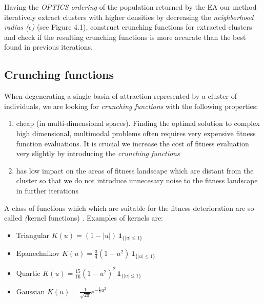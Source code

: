Having the \textit{OPTICS ordering} of the population returned by the EA our
method iteratively extract clusters with higher densities by decreasing 
the \textit{neighborhood radius ($\epsilon$)} (see Figure 4.1), construct
crunching functions for extracted clusters and check if the resulting crunching functions 
is more accurate than the best found in previous iterations. 

\begin{algorithmic}[1]
	\ENDIF
\ENDWHILE
\end{algorithmic}

\subsection{Crunching functions}
When degenerating a single basin of attraction represented by a cluster of
individuals, we are looking for \textit{crunching functions} with the following
properties:

\begin{enumerate}
  \item cheap (in multi-dimensional spaces). Finding the optimal solution to
  complex high dimensional, multimodal problems often requires 
  very expensive fitness function evaluations. It is crucial we increase the
  cost of fitness evaluation very slightly by introducing the \textit{crunching
  functions}
  \item has low impact on the areas of fitness landscape which are distant from
  the cluster so that we do not introduce unnecesary noise to the fitness landscape
  in further iterations
\end{enumerate}

A class of functions which which are suitable for the fitness deterioration are
so called \textit(kernel functions) \cite{kernel}. Examples of kernels are: 
\begin{itemize}
  \item Triangular 	$K(u) = (1-|u|) \,\mathbf{1}_{\{|u|\leq1\}}$
  \item Epanechnikov 	$K(u) = \frac{3}{4}(1-u^2) \,\mathbf{1}_{\{|u|\leq1\}}$
  \item Quartic  $K(u) = \frac{15}{16}(1-u^2)^2 \,\mathbf{1}_{\{|u|\leq1\}}$
  \item Gaussian 	$K(u) = \frac{1}{\sqrt{2\pi}}e^{-\frac{1}{2}u^2}$
\end{itemize}

